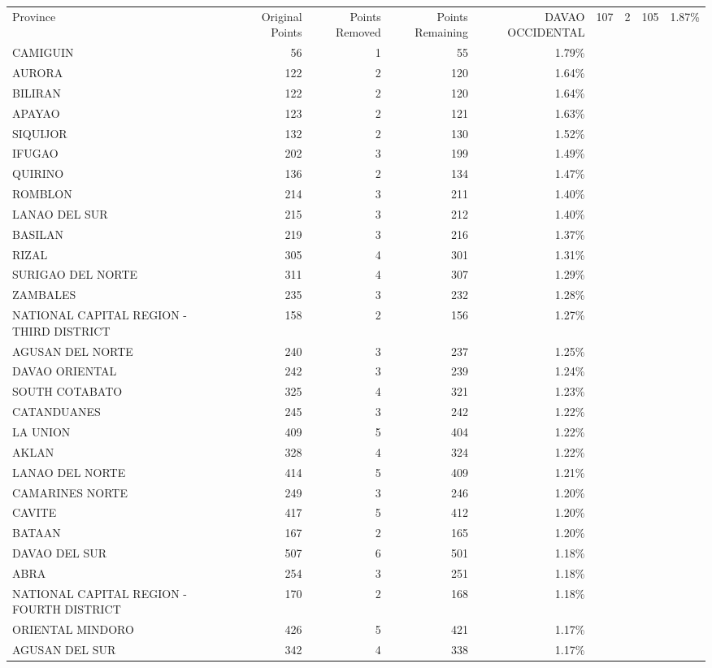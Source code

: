 \begin{tabular}{lrrrr}
\toprule
Province & Original Points & Points Removed & Points Remaining & %
\midrule
DAVAO OCCIDENTAL & 107 & 2 & 105 & 1.87\% \\
CAMIGUIN & 56 & 1 & 55 & 1.79\% \\
AURORA & 122 & 2 & 120 & 1.64\% \\
BILIRAN & 122 & 2 & 120 & 1.64\% \\
APAYAO & 123 & 2 & 121 & 1.63\% \\
SIQUIJOR & 132 & 2 & 130 & 1.52\% \\
IFUGAO & 202 & 3 & 199 & 1.49\% \\
QUIRINO & 136 & 2 & 134 & 1.47\% \\
ROMBLON & 214 & 3 & 211 & 1.40\% \\
LANAO DEL SUR & 215 & 3 & 212 & 1.40\% \\
BASILAN & 219 & 3 & 216 & 1.37\% \\
RIZAL & 305 & 4 & 301 & 1.31\% \\
SURIGAO DEL NORTE & 311 & 4 & 307 & 1.29\% \\
ZAMBALES & 235 & 3 & 232 & 1.28\% \\
NATIONAL CAPITAL REGION - THIRD DISTRICT & 158 & 2 & 156 & 1.27\% \\
AGUSAN DEL NORTE & 240 & 3 & 237 & 1.25\% \\
DAVAO ORIENTAL & 242 & 3 & 239 & 1.24\% \\
SOUTH COTABATO & 325 & 4 & 321 & 1.23\% \\
CATANDUANES & 245 & 3 & 242 & 1.22\% \\
LA UNION & 409 & 5 & 404 & 1.22\% \\
AKLAN & 328 & 4 & 324 & 1.22\% \\
LANAO DEL NORTE & 414 & 5 & 409 & 1.21\% \\
CAMARINES NORTE & 249 & 3 & 246 & 1.20\% \\
CAVITE & 417 & 5 & 412 & 1.20\% \\
BATAAN & 167 & 2 & 165 & 1.20\% \\
DAVAO DEL SUR & 507 & 6 & 501 & 1.18\% \\
ABRA & 254 & 3 & 251 & 1.18\% \\
NATIONAL CAPITAL REGION - FOURTH DISTRICT & 170 & 2 & 168 & 1.18\% \\
ORIENTAL MINDORO & 426 & 5 & 421 & 1.17\% \\
AGUSAN DEL SUR & 342 & 4 & 338 & 1.17\% \\

\end{tabular}
